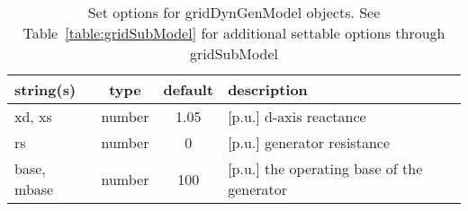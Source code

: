 \begin{table}[ht]
\centering
\begin{tabular}{p{5cm} c c p{7cm}}
\hline
string(s) & type & default & description \\
\hline
xd, xs & number & 1.05 & [p.u.] d-axis reactance\\
rs & number & 0 & [p.u.] generator resistance\\
base, mbase & number & 100 & [p.u.]  the operating base of the generator\\
\hline
\end{tabular}
\caption{Set options for gridDynGenModel objects. See Table~\ref{table:gridSubModel} for additional settable options through gridSubModel}
\label{table:gridDynGenModel}
\end{table}

